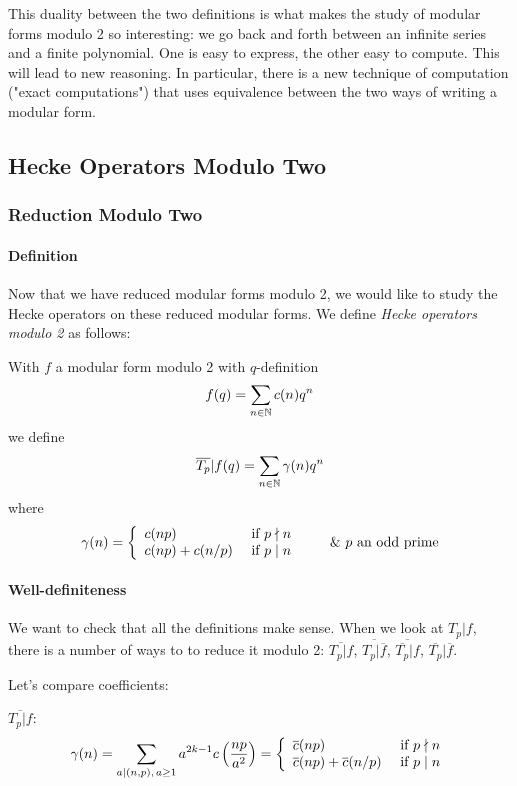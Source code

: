 This duality between the two definitions is what makes the study of modular forms modulo 2 so interesting:
we go back and forth between an infinite series and a finite polynomial.
One is easy to express, the other easy to compute.
This will lead to new reasoning.
In particular, there is a new technique of computation ("exact computations") that uses equivalence between the two ways of writing a modular form.



\subsection{Hecke Operators Modulo Two}
\subsubsection{Reduction Modulo Two}
\paragraph{Definition}
\label{DefHeckeOperatorsMod2}
Now that we have reduced modular forms modulo 2, we would like to study the Hecke operators on these reduced modular forms. We define \textit{Hecke operators modulo 2} as follows:

With $f$ a modular form modulo 2 with $q$-definition
$$
f(q) = \sum_{n \in \mathbb{N}} c(n)q^n
$$
we define
$$
\overline{T_p}|f(q) = \sum_{n \in \mathbb{N}} \gamma(n)q^n
$$
where
$$
\gamma(n) = 
\left\lbrace
\begin{array}{l l}
  c(np)        & \text{ if } p \nmid n \\
  c(np)+c(n/p) & \text{ if } p \mid  n
\end{array}
\right. 
\qquad \&\ p \text{ an odd prime}
$$

\paragraph{Well-definiteness}
We want to check that all the definitions make sense. When we look at $T_p|f$, there is a number of ways to to reduce it modulo 2: $\overline{T_p|f}$, $\overline{T_p|\overline{f}}$, $\overline{\overline{T_p}|f}$, $\overline{T_p}|\overline{f}$.

Let's compare coefficients:

$\overline{T_p|f}$:
$$
\gamma(n) 
= \sum_{a \mid (n,p),\, a \geq 1} a^{2k-1} c\left( \frac{np}{a^2} \right)
= \left\lbrace
\begin{array}{l l}
  \overline{c}(np)                   & \text{ if } p \nmid n \\
  \overline{c}(np)+\overline{c}(n/p) & \text{ if } p \mid  n
\end{array}
\right.
$$

